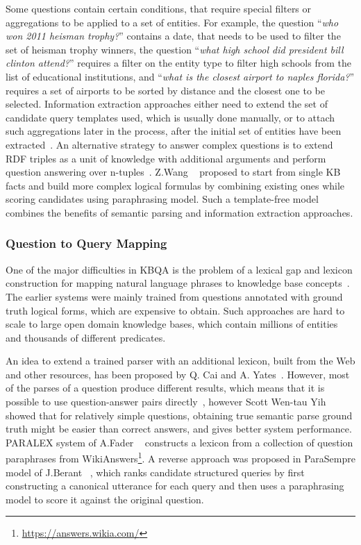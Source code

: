 Some questions contain certain conditions, that require special filters or aggregations to be applied to a set of entities. 
For example, the question ``\textit{who won 2011 heisman trophy?}'' contains a date, that needs to be used to filter the set of heisman trophy winners, the question ``\textit{what high school did president bill clinton attend?}'' requires a filter on the entity type to filter high schools from the list of educational institutions, and ``\textit{what is the closest airport to naples florida?}'' requires a set of airports to be sorted by distance and the closest one to be selected.
Information extraction approaches either need to extend the set of candidate query templates used, which is usually done manually, or to attach such aggregations later in the process, after the initial set of entities have been extracted~\cite{yih:ACL:2015:STAGG,xu2016enhancing}.
An alternative strategy to answer complex questions is to extend RDF triples as a unit of knowledge with additional arguments and perform question answering over n-tuples~\cite{yin2015answering}.
Z.Wang \etal~\cite{wang2015large} proposed to start from single KB facts and build more complex logical formulas by combining existing ones while scoring candidates using paraphrasing model.
Such a template-free model combines the benefits of semantic parsing and information extraction approaches.

\subsubsection{Question to Query Mapping}
\label{section:relatedwork:factoid:kbqa:mapping}

One of the major difficulties in KBQA is the problem of a lexical gap and lexicon construction for mapping natural language phrases to knowledge base concepts~\cite{fader2013paraphrase,BerantL14:parasempre}.
The earlier systems were mainly trained from questions annotated with ground truth logical forms, which are expensive to obtain.
Such approaches are hard to scale to large open domain knowledge bases, which contain millions of entities and thousands of different predicates.

An idea to extend a trained parser with an additional lexicon, built from the Web and other resources, has been proposed by Q. Cai and A. Yates~\cite{CaiY13}.
However, most of the parses of a question produce different results, which means that it is possible to use question-answer pairs directly~\cite{BerantCFL13:sempre}, however Scott Wen-tau Yih \etal~\cite{yih2016webquestionssp} showed that for relatively simple questions, obtaining true semantic parse ground truth might be easier than correct answers, and gives better system performance.
PARALEX system of A.Fader \etal~\cite{fader2013paraphrase} constructs a lexicon from a collection of question paraphrases from WikiAnswers\footnote{\href{url}{https://answers.wikia.com/}}.
A reverse approach was proposed in ParaSempre model of J.Berant \etal~\cite{BerantL14:parasempre}, which ranks candidate structured queries by first constructing a canonical utterance for each query and then uses a paraphrasing model to score it against the original question.

